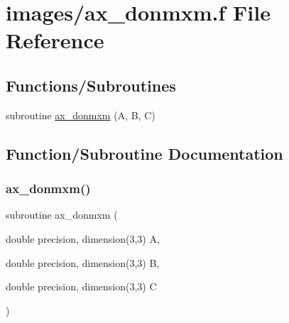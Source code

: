\hypertarget{ax__donmxm_8f}{}\section{images/ax\+\_\+donmxm.f File Reference}
\label{ax__donmxm_8f}
\subsection*{Functions/\+Subroutines}
\begin{DoxyCompactItemize}
\item 
subroutine \hyperlink{ax__donmxm_8f_a9833922d56f9bccd367303758a1bea86}{ax\+\_\+donmxm} (A, B, C)
\end{DoxyCompactItemize}


\subsection{Function/\+Subroutine Documentation}
\mbox{\label{ax__donmxm_8f_a9833922d56f9bccd367303758a1bea86}} 
\subsubsection{\texorpdfstring{ax\+\_\+donmxm()}{ax\_donmxm()}}
{\footnotesize\ttfamily subroutine ax\+\_\+donmxm (\begin{DoxyParamCaption}\item[{double precision, dimension(3,3)}]{A,  }\item[{double precision, dimension(3,3)}]{B,  }\item[{double precision, dimension(3,3)}]{C }\end{DoxyParamCaption})}

